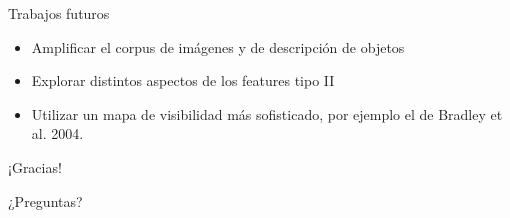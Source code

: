 \documentclass[compress]{beamer}
\begin{document}
\begin{frame}{Trabajos futuros}
\begin{itemize}
\item Amplificar el corpus de imágenes y de descripción de objetos
\item Explorar distintos aspectos de los features tipo II
\item Utilizar un mapa de visibilidad más sofisticado, por ejemplo el de Bradley et al. 2004.
\end{itemize}
\end{frame}

\begin{frame}
\begin{center}
\Huge ¡Gracias!

\bigskip

\huge ¿Preguntas?
\end{center}
\end{frame}
\end{document}
